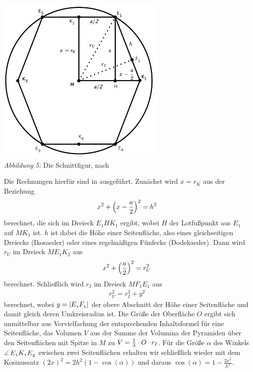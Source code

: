 \documentclass[11pt]{article}
\begin{document}
\begin{center}
  \includegraphics[width=.5\textwidth]{graebe-05-1/Schnittfigur.pdf}\\
  \emph{Abbildung 5:} Die Schnittfigur, nach \cite{Fendt1}
\end{center}

Die Rechnungen hierfür sind in \cite{Fendt1, Fendt2} ausgeführt.  Zunächst
wird $x=r_K$ aus der Beziehung 
\begin{gather*}
  x^2+\left(x-\frac{a}{2}\right)^2=h^2
\end{gather*}
berechnet, die sich im Dreieck $E_1HK_1$ ergibt, wobei $H$ der Lotfußpunkt aus
$E_1$ auf $MK_1$ ist.  $h$ ist dabei die Höhe einer Seitenfläche, also eines
gleichseitigen Dreiecks (Ikosaeder) oder eines regelmäßigen Fünfecks
(Dodekaeder).  Dann wird $r_U$ im Dreieck $ME_1K_2$ aus
\begin{gather*}
  x^2+\left(\frac{a}{2}\right)^2=r_U^2
\end{gather*}
berechnet.  Schließlich wird $r_I$ im Dreieck $MF_1E_1$ aus
\begin{gather*}
  r_U^2=r_I^2+y^2
\end{gather*}
berechnet, wobei $y=\left\vert {\mathnormal{E_1F_1}}\right\vert$ der obere Abschnitt der Höhe einer
Seitenfläche und damit gleich deren Umkreisradius ist.  Die Größe der
Oberfläche $O$ ergibt sich unmittelbar aus Vervielfachung der entsprechenden
Inhaltsformel für eine Seitenfläche, das Volumen $V$ aus der Summe der
Volumina der Pyramiden über den Seitenflächen mit Spitze in $M$ zu
$V=\frac13\cdot O\cdot r_I$.  Für die Größe $\alpha$ des Winkels
$\kangle{E_1K_1E_4}$ zwischen zwei Seitenflächen erhalten wir schließlich
wieder mit dem Kosinussatz $(2x)^2=2h^2(1-\cos(\alpha))$ und daraus
$\cos(\alpha)=1-\frac{2x^2}{h^2}$.  
\end{document}
